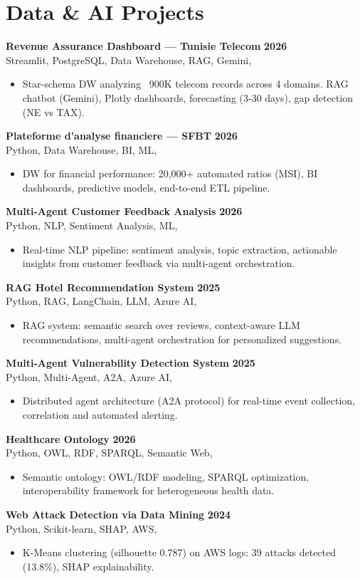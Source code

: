 \documentclass[a4paper,9pt]{article}
\newcommand{\cventry}[4]{\textbf{#1} \hfill \textbf{#4}\\[1pt]#2{\ifx\relax#3\relax\else, #3\fi}\par\vspace{1pt}}
\begin{document}
\section{Data \& AI Projects}
\cventry{Revenue Assurance Dashboard --- Tunisie Telecom}{Streamlit, PostgreSQL, Data Warehouse, RAG, Gemini}{}{2026}
\begin{itemize}
  \item Star-schema DW analyzing ~900K telecom records across 4 domains. RAG chatbot (Gemini), Plotly dashboards, forecasting (3-30 days), gap detection (NE vs TAX).
\end{itemize}
\cventry{Plateforme d'analyse financiere --- SFBT}{Python, Data Warehouse, BI, ML}{}{2026}
\begin{itemize}
  \item DW for financial performance: 20,000+ automated ratios (MSI), BI dashboards, predictive models, end-to-end ETL pipeline.
\end{itemize}
\cventry{Multi-Agent Customer Feedback Analysis}{Python, NLP, Sentiment Analysis, ML}{}{2026}
\begin{itemize}
  \item Real-time NLP pipeline: sentiment analysis, topic extraction, actionable insights from customer feedback via multi-agent orchestration.
\end{itemize}
\cventry{RAG Hotel Recommendation System}{Python, RAG, LangChain, LLM, Azure AI}{}{2025}
\begin{itemize}
  \item RAG system: semantic search over reviews, context-aware LLM recommendations, multi-agent orchestration for personalized suggestions.
\end{itemize}
\cventry{Multi-Agent Vulnerability Detection System}{Python, Multi-Agent, A2A, Azure AI}{}{2025}
\begin{itemize}
  \item Distributed agent architecture (A2A protocol) for real-time event collection, correlation and automated alerting.
\end{itemize}
\cventry{Healthcare Ontology}{Python, OWL, RDF, SPARQL, Semantic Web}{}{2026}
\begin{itemize}
  \item Semantic ontology: OWL/RDF modeling, SPARQL optimization, interoperability framework for heterogeneous health data.
\end{itemize}
\cventry{Web Attack Detection via Data Mining}{Python, Scikit-learn, SHAP, AWS}{}{2024}
\begin{itemize}
  \item K-Means clustering (silhouette 0.787) on AWS logs: 39 attacks detected (13.8\%), SHAP explainability.
\end{itemize}
\end{document}
